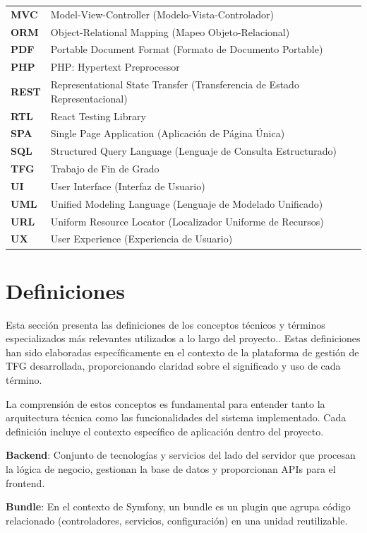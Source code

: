 \documentclass[12pt,a4paper,oneside]{report}
\begin{document}
\begin{longtable}[]{@{}
  >{\raggedright\arraybackslash}p{}
  >{\raggedright\arraybackslash}p{}@{}}
\textbf{MVC} & Model-View-Controller (Modelo-Vista-Controlador) \\
\textbf{ORM} & Object-Relational Mapping (Mapeo Objeto-Relacional) \\
\textbf{PDF} & Portable Document Format (Formato de Documento
Portable) \\
\textbf{PHP} & PHP: Hypertext Preprocessor \\
\textbf{REST} & Representational State Transfer (Transferencia de Estado
Representacional) \\
\textbf{RTL} & React Testing Library \\
\textbf{SPA} & Single Page Application (Aplicación de Página Única) \\
\textbf{SQL} & Structured Query Language (Lenguaje de Consulta
Estructurado) \\
\textbf{TFG} & Trabajo de Fin de Grado \\
\textbf{UI} & User Interface (Interfaz de Usuario) \\
\textbf{UML} & Unified Modeling Language (Lenguaje de Modelado
Unificado) \\
\textbf{URL} & Uniform Resource Locator (Localizador Uniforme de
Recursos) \\
\textbf{UX} & User Experience (Experiencia de Usuario) \\
\end{longtable}

\section{Definiciones}\label{definiciones}

Esta sección presenta las definiciones de los conceptos técnicos y
términos especializados más relevantes utilizados a lo largo del
proyecto.. Estas definiciones han sido elaboradas específicamente en el
contexto de la plataforma de gestión de TFG desarrollada, proporcionando
claridad sobre el significado y uso de cada término.

La comprensión de estos conceptos es fundamental para entender tanto la
arquitectura técnica como las funcionalidades del sistema implementado.
Cada definición incluye el contexto específico de aplicación dentro del
proyecto.

\textbf{Backend}: Conjunto de tecnologías y servicios del lado del
servidor que procesan la lógica de negocio, gestionan la base de datos y
proporcionan APIs para el frontend.

\textbf{Bundle}: En el contexto de Symfony, un bundle es un plugin que
agrupa código relacionado (controladores, servicios, configuración) en
una unidad reutilizable.
\end{document}
